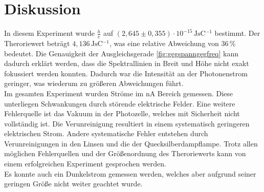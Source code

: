 \section{Diskussion}
\label{sec:Diskussion}

In diesem Experiment wurde $ \frac{h}{e}$ auf $(2,645 \pm 0,355) \cdot 10^{-15} \,\si{\joule\second\coulomb^{-1}}$ bestimmt.
Der Theroriewert beträgt $4,136 \,\si{\joule\second\coulomb^{-1}}$, was eine relative Abweichung von $36 \, \%$ bedeutet. Die Genauigkeit der Ausgleichsgerade \autoref{fig:gegspanngegfreq} kann dadurch erklärt werden, dass die Spektrallinien in Breit und Höhe nicht exakt fokussiert werden konnten.
Dadurch war die Intensität an der Photonenstrom geringer, was wiederum zu größeren Abweichungen führt. \\

Im gesamten Experiment wurden Ströme im $ \unit{\nano\ampere}$ Bereich gemessen. Diese unterliegen Schwankungen durch störende elektrische Felder.
Eine weitere Fehlerquelle ist das Vakuum in der Photozelle, welches mit Sicherheit nicht vollständig ist. Die Verunreinigung resultiert in einem systematisch geringeren elektrischen Strom.
Andere systematische Fehler entstehen durch Verunreinigungen in den Linsen und die der Quecksilberdampflampe. Trotz allen möglichen Fehlerquellen und der Größenordnung des Theroriewerts kann von einem erfolgreichen Experiment gesprochen werden. \\
Es konnte auch ein Dunkelstrom gemessen werden, welches aber aufgrund seiner geringen Größe nicht weiter geachtet wurde.\\